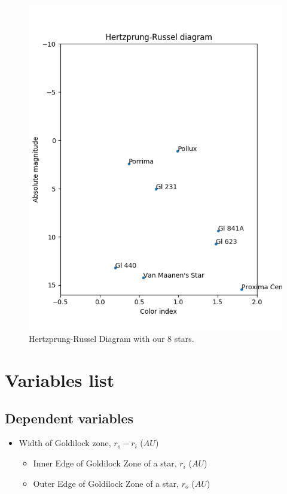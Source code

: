 \documentclass{article}
\begin{document}
\begin{figure}[h]
\begin{minipage}[b]{0.45\textwidth}
      \includegraphics[width=\textwidth]{stretch.png}
      \caption{Hertzprung-Russel Diagram with our 8 stars.}
      \label{str}
    \end{minipage}
  \end{figure}
  
  
  \section{Variables list}
  
  \subsection{Dependent variables}
  
  \begin{itemize}

  \item Width of Goldilock zone, $r_o-r_i$ ($AU$)
    
    \begin{itemize}
      
    \item Inner Edge of Goldilock Zone of a star, $r_i$ ($AU$) 
      
    \item Outer Edge of Goldilock Zone of a star, $r_o$ ($AU$)
      
    \end{itemize}
    
  \end{itemize}
  
\end{document}
